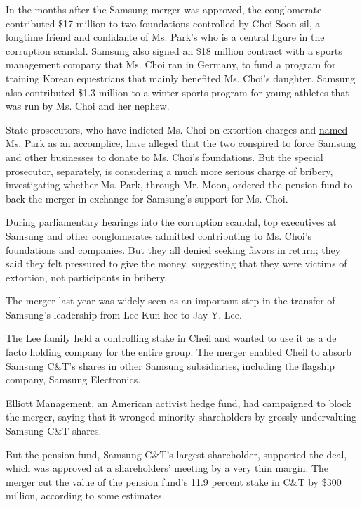 In the months after the Samsung merger was approved, the conglomerate
contributed \$17 million to two foundations controlled by Choi Soon-sil,
a longtime friend and confidante of Ms. Park's who is a central figure
in the corruption scandal. Samsung also signed an \$18 million contract
with a sports management company that Ms. Choi ran in Germany, to fund a
program for training Korean equestrians that mainly benefited Ms. Choi's
daughter. Samsung also contributed \$1.3 million to a winter sports
program for young athletes that was run by Ms. Choi and her nephew.

State prosecutors, who have indicted Ms. Choi on extortion charges and
\href{http://www.nytimes3xbfgragh.onion/2016/11/20/world/asia/park-geun-hye-south-korea-extortion-accomplice-prosecutors.html}{named
Ms. Park as an accomplice}, have alleged that the two conspired to force
Samsung and other businesses to donate to Ms. Choi's foundations. But
the special prosecutor, separately, is considering a much more serious
charge of bribery, investigating whether Ms. Park, through Mr. Moon,
ordered the pension fund to back the merger in exchange for Samsung's
support for Ms. Choi.

During parliamentary hearings into the corruption scandal, top
executives at Samsung and other conglomerates admitted contributing to
Ms. Choi's foundations and companies. But they all denied seeking favors
in return; they said they felt pressured to give the money, suggesting
that they were victims of extortion, not participants in bribery.

The merger last year was widely seen as an important step in the
transfer of Samsung's leadership from Lee Kun-hee to Jay Y. Lee.

The Lee family held a controlling stake in Cheil and wanted to use it as
a de facto holding company for the entire group. The merger enabled
Cheil to absorb Samsung C\&T's shares in other Samsung subsidiaries,
including the flagship company, Samsung Electronics.

Elliott Management, an American activist hedge fund, had campaigned to
block the merger, saying that it wronged minority shareholders by
grossly undervaluing Samsung C\&T shares.

But the pension fund, Samsung C\&T's largest shareholder, supported the
deal, which was approved at a shareholders' meeting by a very thin
margin. The merger cut the value of the pension fund's 11.9 percent
stake in C\&T by \$300 million, according to some estimates.

